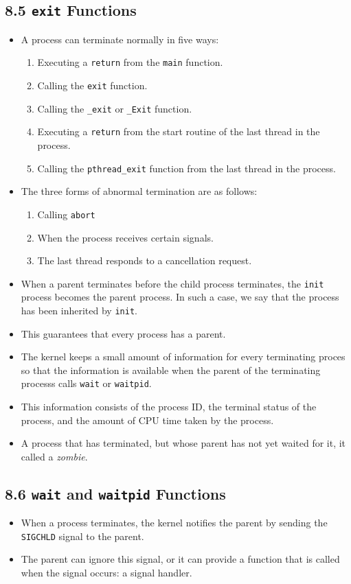 \documentclass[]{article} \usepackage[all]{xy}
\newcommand{\code}{\texttt}
\begin{document}
\subsection*{8.5 \code{exit} Functions}
\begin{itemize}
\item A process can terminate normally in five ways:
\begin{enumerate}
\item Executing a \code{return} from the \code{main} function.
\item Calling the \code{exit} function.
\item Calling the \code{\_exit} or \code{\_Exit} function.
\item Executing a \code{return} from the start routine of the last thread in the
process.
\item Calling the \code{pthread\_exit} function from the last thread in the
process.
\end{enumerate}
\item The three forms of abnormal termination are as follows:
\begin{enumerate}
\item Calling \code{abort}
\item When the process receives certain signals.
\item The last thread responds to a cancellation request.
\end{enumerate}
\item When a parent terminates before the child process terminates, the
\code{init} process becomes the parent process. In such a case, we say that the
process has been inherited by \code{init}.
\item This guarantees that every process has a parent.
\item The kernel keeps a small amount of information for every terminating
proces so that the information is available when the parent of the terminating
processs calls \code{wait} or \code{waitpid}.
\item This information consists of the process ID, the terminal status of the
process, and the amount of CPU time taken by the process.
\item A process that has terminated, but whose parent has not yet waited for it,
it called a \emph{zombie}.
\end{itemize}

\subsection*{8.6 \code{wait} and \code{waitpid} Functions}
\begin{itemize}
\item When a process terminates, the kernel notifies the parent by sending the
\code{SIGCHLD} signal to the parent.
\item The parent can ignore this signal, or it can provide a function that is
called when the signal occurs: a signal handler.
\end{itemize}
\end{document}
